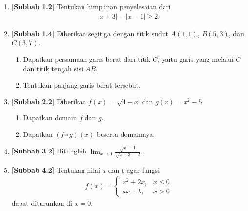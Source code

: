 \documentclass[10pt,openany,a4paper]{article}
\theoremstyle{definition}
\theoremstyle{definition}
\theoremstyle{plain}
\begin{document}
\newpage

\begin{enumerate}
    \item \textbf{[Subbab 1.2]} Tentukan himpunan penyelesaian dari
    \begin{align*}
        |x+3|-|x-1|\geq 2.
    \end{align*}

    \item \textbf{[Subbab 1.4]} Diberikan segitiga dengan titik sudut $A(1,1)$, $B(5,3)$, dan $C(3,7)$.
    \begin{enumerate}
        \item Dapatkan persamaan garis berat dari titik $C$, yaitu garis yang melalui $C$ dan titik tengah sisi $AB$.
        \item Tentukan panjang garis berat tersebut.
    \end{enumerate}

    \item \textbf{[Subbab 2.2]} Diberikan $f(x)=\sqrt{4-x}$ dan $g(x)=x^2-5$.
    \begin{enumerate}
        \item Dapatkan domain $f$ dan $g$.
        \item Dapatkan $(f\circ g)(x)$ beserta domainnya.
    \end{enumerate}

    \item \textbf{[Subbab 3.2]} Hitunglah $\displaystyle\lim_{x\to 1}\frac{\sqrt{x}-1}{\sqrt{x+3}-2}$.

    \item \textbf{[Subbab 4.2]} Tentukan nilai $a$ dan $b$ agar fungsi
    \begin{align*}
        f(x)=\begin{cases}
            x^2+2x, & x\leq 0\\
            ax+b, & x>0
        \end{cases}
    \end{align*}
    dapat diturunkan di $x=0$.
\end{enumerate}

\newpage
\end{document}
